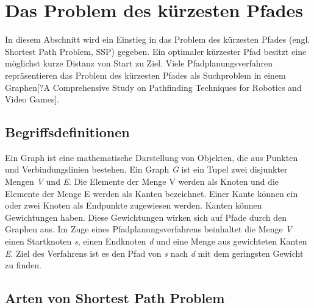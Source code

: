\chapter{Das Problem des kürzesten Pfades}

In diesem Abschnitt wird ein Einstieg in das Problem des kürzesten Pfades (engl. Shortest Path Problem, SSP) gegeben. Ein optimaler kürzester Pfad besitzt eine möglichst kurze Distanz von Start zu Ziel\cite{Madkour.2017}. Viele Pfadplanungsverfahren repräsentieren das Problem des kürzesten Pfades als Suchproblem in einem Graphen[?A Comprehensive Study on Pathfinding Techniques for Robotics and Video Games]. %

\section{Begriffsdefinitionen}

Ein Graph ist eine mathematische Darstellung von Objekten, die aus Punkten und Verbindungslinien bestehen. Ein Graph \textit{G} ist ein Tupel zwei disjunkter Mengen \textit{V} und \textit{E}. Die Elemente der Menge V werden als Knoten und die Elemente der Menge E werden als Kanten bezeichnet. Einer Kante können ein oder zwei Knoten als Endpunkte zugewiesen werden. Kanten können Gewichtungen haben. Diese Gewichtungen wirken sich auf Pfade durch den Graphen aus\cite{Gross.2004}. Im Zuge eines Pfadplanungsverfahrens beinhaltet die Menge \textit{V} einen Startknoten \textit{s}, einen Endknoten \textit{d} und eine Menge aus gewichteten Kanten \textit{E}. %
Ziel des Verfahrens ist es den Pfad von \textit{s} nach \textit{d} mit dem geringsten Gewicht zu finden\cite{Madkour.2017}. 



\section{Arten von Shortest Path Problem}